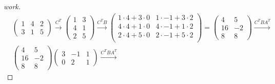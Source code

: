 \documentclass{article}
\begin{document}
\begin{question}{1.3}{}
  \begin{proof}[work]
    \begin{align*}
       & \begin{pmatrix}
           1 & 4 & 2 \\
           3 & 1 & 5
         \end{pmatrix} \xrightarrow{C^T}
      \begin{pmatrix}
        1 & 3 \\
        4 & 1 \\
        2 & 5
      \end{pmatrix}  \xrightarrow{C^TB}
      \begin{pmatrix}
        1 \cdot 4 + 3 \cdot 0 & 1 \cdot -1 + 3 \cdot 2 \\
        4 \cdot 4 + 1 \cdot 0 & 4 \cdot -1 + 1 \cdot 2 \\
        2 \cdot 4 + 5 \cdot 0 & 2 \cdot -1 + 5 \cdot 2 \\
      \end{pmatrix} =
      \begin{pmatrix}
        4  & 5  \\
        16 & -2 \\
        8  & 8
      \end{pmatrix} \xrightarrow{C^TBA^T} \\
       & \begin{pmatrix}
           4  & 5  \\
           16 & -2 \\
           8  & 8
         \end{pmatrix}
      \begin{pmatrix}
        3 & -1 & 1 \\
        0 & 2  & 1
      \end{pmatrix}  \xrightarrow{C^TBA^T}

\end{align*}
\end{proof}
\end{question}
\end{document}
